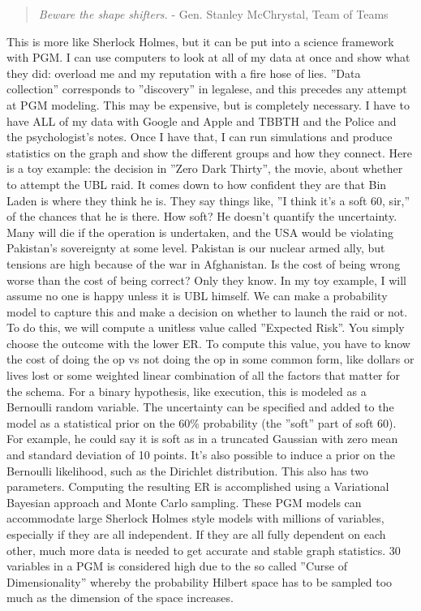 \documentclass{article}
\begin{document}
\begin{multicols}{2}
\begin{quote}
\emph{Beware the shape shifters.}
  - Gen. Stanley McChrystal, Team of Teams
\end{quote}

This is more like Sherlock Holmes, but it can be put into a science framework with PGM. I can use computers to look at all of my data at once and show what they did: overload me and my reputation with a fire hose of lies. ''Data collection'' corresponds to ''discovery'' in legalese, and this precedes any attempt at PGM modeling. This may be expensive, but is completely necessary. I have to have ALL of my data with Google and Apple and TBBTH and the Police and the psychologist's notes. Once I have that, I can run simulations and produce statistics on the graph and show the different groups and how they connect. Here is a toy example: the decision in ''Zero Dark Thirty'', the movie, about whether to attempt the UBL raid. It comes down to how confident they are that Bin Laden is where they think he is. They say things like, ''I think it's a soft 60, sir,'' of the chances that he is there. How soft? He doesn't quantify the uncertainty. Many will die if the operation is undertaken, and the USA would be violating Pakistan's sovereignty at some level. Pakistan is our nuclear armed ally, but tensions are high because of the war in Afghanistan. Is the cost of being wrong worse than the cost of being correct? Only they know. In my toy example, I will assume no one is happy unless it is UBL himself. We can make a probability model to capture this and make a decision on whether to launch the raid or not. To do this, we will compute a unitless value called ''Expected Risk''. You simply choose the outcome with the lower ER. To compute this value, you have to know the cost of doing the op vs not doing the op in some common form, like dollars or lives lost or some weighted linear combination of all the factors that matter for the schema. For a binary hypothesis, like execution, this is modeled as a Bernoulli random variable. The uncertainty can be specified and added to the model as a statistical prior on the 60\% probability (the ''soft'' part of soft 60). For example, he could say it is soft as in a truncated Gaussian with zero mean and standard deviation of 10 points. It's also possible to induce a prior on the Bernoulli likelihood, such as the Dirichlet distribution. This also has two parameters. Computing the resulting ER is accomplished using a Variational Bayesian approach and Monte Carlo sampling. These PGM models can accommodate large Sherlock Holmes style models with millions of variables, especially if they are all independent. If they are all fully dependent on each other, much more data is needed to get accurate and stable graph statistics. 30 variables in a PGM is considered high due to the so called ''Curse of Dimensionality'' whereby the probability Hilbert space has to be sampled too much as the dimension of the space increases.


\end{multicols}
\end{document}
